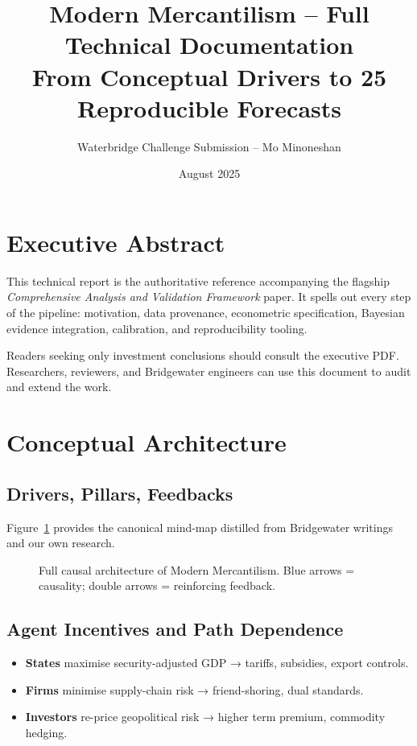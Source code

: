 \documentclass{article}
\title{Modern Mercantilism – \Huge Full Technical Documentation\\ \large From Conceptual Drivers to 25 Reproducible Forecasts}
\author{Waterbridge Challenge Submission – Mo Minoneshan}
\date{August 2025}
\begin{document}
\maketitle
\tableofcontents
\newpage
\section{Executive Abstract}
This technical report is the authoritative reference accompanying the flagship \emph{Comprehensive Analysis and Validation Framework} paper.  It spells out every step of the pipeline: motivation, data provenance, econometric specification, Bayesian evidence integration, calibration, and reproducibility tooling.

Readers seeking only investment conclusions should consult the executive PDF.  Researchers, reviewers, and Bridgewater engineers can use this document to audit and extend the work.

\section{Conceptual Architecture}
\subsection{Drivers, Pillars, Feedbacks}
Figure~\ref{fig:mindmap-full} provides the canonical mind-map distilled from Bridgewater writings and our own research.

\begin{figure}[H]
  \centering
  \caption{Full causal architecture of Modern Mercantilism. Blue arrows = causality; double arrows = reinforcing feedback.}
  \label{fig:mindmap-full}
\end{figure}

\subsection{Agent Incentives and Path Dependence}
\begin{itemize}
  \item \textbf{States} maximise security-adjusted GDP → tariffs, subsidies, export controls.
  \item \textbf{Firms} minimise supply-chain risk → friend-shoring, dual standards.
  \item \textbf{Investors} re-price geopolitical risk → higher term premium, commodity hedging.
\end{itemize}
\end{document}
